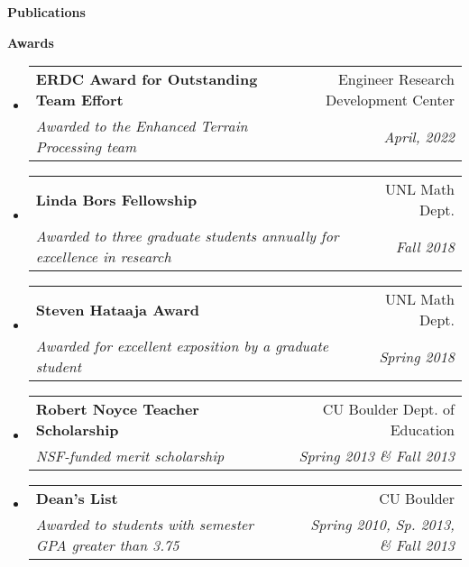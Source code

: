 \documentclass[letterpaper,11pt]{article}
\makeatletter
\newcommand{\resitem}[1]{\item #1 \vspace{-2pt}}
\newcommand{\resheading}[1]{{\large \colorbox{mygrey}{\begin{minipage}{\textwidth}{\textbf{#1 \vphantom{p\^{E}}}}\end{minipage}}}}
\newcommand{\ressubheading}[4]{
\begin{tabular*}{6.5in}{l@{\extracolsep{\fill}}r}
		\textbf{#1} & #2 \\
		\textit{#3} & \textit{#4} \\
\end{tabular*}\vspace{-6pt}}
\makeatother
\begin{document}
\begin{itemize}
{\begin{itemize}
				\end{itemize}
				}
	\end{itemize}

\resheading{Publications}

\nocite{*}
\printbibliography[heading=none]

\resheading{Awards}
\begin{itemize}
	\item
	\ressubheading{ERDC Award for Outstanding Team Effort}{Engineer Research Development Center}{Awarded to the Enhanced Terrain Processing team}{April, 2022}
	\item
	\ressubheading{Linda Bors Fellowship}{UNL Math Dept.}{Awarded to three graduate students annually for excellence in research}{Fall 2018}
	\item
	\ressubheading{Steven Hataaja Award}{UNL Math Dept.}{Awarded for excellent exposition by a graduate student}{Spring 2018}
	\item
	\ressubheading{Robert Noyce Teacher Scholarship}{CU Boulder Dept. of Education}{NSF-funded merit scholarship}{Spring 2013 \& Fall 2013}
	\item
	\ressubheading{Dean's List}{CU Boulder}{Awarded to students with semester GPA greater than 3.75}{Spring 2010, Sp. 2013, \& Fall 2013}
\end{itemize}
\end{document}
